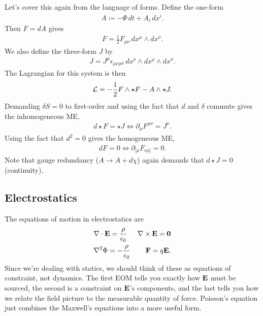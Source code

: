\documentclass[11pt]{article}
\begin{document}
\begin{dderivation}
    \noin
    Let's cover this again from the language of forms.
    Define the one-form
    \begin{align*}
        A \coloneqq - \Phi \, dt + A_i \, dx^i.
    \end{align*}
    Then $F = dA$ gives
    \begin{align*}
        F = \frac{1}{2} F_{\mu \nu} \, dx^\mu \wedge dx^\nu.
    \end{align*} 
    We also define the three-form $J$ by
    \begin{align*}
        J = J^\mu \epsilon_{\mu \nu \rho \sigma} \, dx^\nu \wedge dx^\rho \wedge dx^\sigma.
    \end{align*}
    The Lagrangian for this system is then
    \begin{align*}
        \mathcal{L} = - \frac{1}{2} F \wedge \star F - A \wedge \star J.
    \end{align*}
    Demanding $\delta S = 0$ to first-order and using the fact that
    $d$ and $\delta$ commute gives the inhomogeneous ME,
    \begin{align*}
        \boxed{d \star F = \star J} \iff \partial_\mu F^{\mu \nu} = J^\nu.
    \end{align*}
    Using the fact that $d^2 = 0$ gives the homogeneous ME,
    \begin{align*}
       \boxed{dF = 0} \iff \partial_{[\mu} F_{\nu \rho]} = 0.
    \end{align*}
    Note that gauge redundancy ($A \to A + d\chi$) again demands
    that $d \star J = 0$ (continuity).
\end{dderivation}


\subsection{Electrostatics}

The equations of motion in electrostatics are
\begin{align*}
    & \nabla \cdot \mathbf{E} = \frac{\rho}{\epsilon_0}
    & \nabla \times \mathbf{E} = \mathbf{0}\\
    & \nabla^2 \Phi = - \frac{\rho}{\epsilon_0}
    & \mathbf{F} = q \mathbf{E}.
\end{align*}
Since we're dealing with statics, we should think of these as equations of constraint,
not dynamics. The first EOM tells you exactly how $\mathbf{E}$ must be sourced,
the second is a constraint on $\mathbf{E}$'s components,
and the last tells you how we relate the field picture
to the measurable quantity of force. Poisson's equation 
just combines the Maxwell's equations into a more useful 
form.
\end{document}
